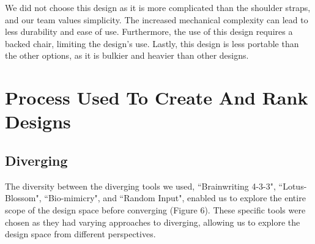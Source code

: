 \documentclass[11pt]{article}
\begin{document}
We did not choose this design as it is more complicated than the shoulder straps, and our team values simplicity. The increased mechanical complexity can lead to less durability and ease of use. Furthermore, the use of this design requires a backed chair, limiting the design's use. Lastly, this design is less portable than the other options, as it is bulkier and heavier than other designs.


\section{Process Used To Create And Rank Designs} %
\subsection{Diverging}
The diversity between the diverging tools we used, ``Brainwriting 4-3-3",  ``Lotus-Blossom", ``Bio-mimicry", and ``Random Input", enabled us to explore the entire scope of the design space before converging (Figure 6). These specific tools were chosen as they had varying approaches to diverging, allowing us to explore the design space from different perspectives.
\end{document}
